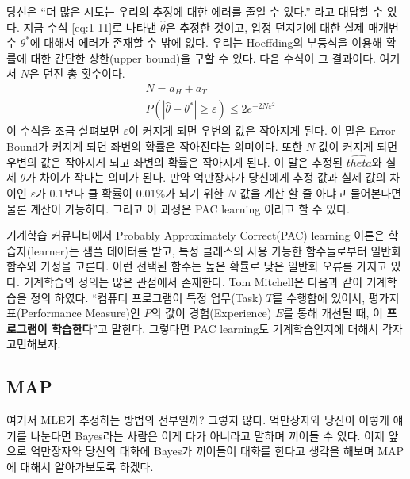 \documentclass[a4paper]{oblivoir}
\begin{document}
\indent 당신은 ``더 많은 시도는 우리의 추정에 대한 에러를 줄일 수 있다.'' 라고 대답할 수 있다. 지금 수식 \eqref{eq:1-11}로 나타낸 $\hat{\theta}$은 추정한 것이고, 압정 던지기에 대한 실제 매개변수 $\theta^*$에 대해서 에러가 존재할 수 밖에 없다. 우리는 Hoeffding의 부등식을 이용해 확률에 대한 간단한 상한(upper bound)을 구할 수 있다. 다음 수식이 그 결과이다. 여기서 $N$은 던진 총 횟수이다.
\begin{align}
&N=a_H+a_T\\
&P(|\hat{\theta}-\theta^*|\geq\varepsilon)\leq2e^{-2N\varepsilon^2}
\end{align}
\indent 이 수식을 조금 살펴보면 $\varepsilon$이 커지게 되면 우변의 값은 작아지게 된다. 이 말은 Error Bound가 커지게 되면 좌변의 확률은 작아진다는 의미이다. 또한 $N$ 값이 커지게 되면 우변의 값은 작아지게 되고 좌변의 확률은 작아지게 된다. 이 말은 추정된 $\hat{theta}$와 실제 $\theta$가 차이가 작다는 의미가 된다. 만약 억만장자가 당신에게 추정 값과 실제 값의 차이인 $\varepsilon$가 0.1보다 클 확률이 0.01\%가 되기 위한 $N$ 값을 계산 할 줄 아냐고 물어본다면 물론 계산이 가능하다. 그리고 이 과정은 PAC learning 이라고 할 수 있다. 

\indent 기계학습 커뮤니티에서 Probably Approximately Correct(PAC) learning 이론은 학습자(learner)는 샘플 데이터를 받고, 특정 클래스의 사용 가능한 함수들로부터 일반화 함수와 가정을 고른다. 이런 선택된 함수는 높은 확률로 낮은 일반화 오류를 가지고 있다. 기계학습의 정의는 많은 관점에서 존재한다. Tom Mitchell은 다음과 같이 기계학습을 정의 하였다. ``컴퓨터 프로그램이 특정 업무(Task) $T$를 수행함에 있어서, 평가지표(Performance Measure)인 $P$의 값이 경험(Experience) $E$를 통해 개선될 때, 이 \textbf{프로그램이 학습한다}''고 말한다. 그렇다면 PAC learning도 기계학습인지에 대해서 각자 고민해보자.\\
\subsection{MAP}

\indent 여기서 MLE가 추정하는 방법의 전부일까? 그렇지 않다. 억만장자와 당신이 이렇게 얘기를 나눈다면 Bayes라는 사람은 이게 다가 아니라고 말하며 끼어들 수 있다. 이제 앞으로 억만장자와 당신의 대화에 Bayes가 끼어들어 대화를 한다고 생각을 해보며 MAP에 대해서 알아가보도록 하겠다.\\
\end{document}
